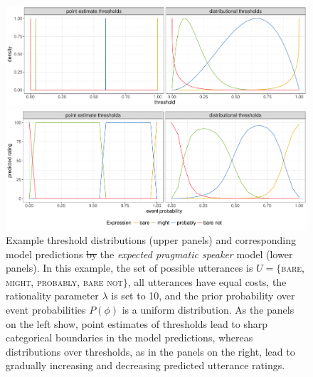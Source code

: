 \documentclass[man, floatsintext]{apa6}
\providecommand{\DIFadd}[1]{{\protect\color{blue}\uwave{#1}}} %
\providecommand{\DIFdel}[1]{{\protect\color{red}\sout{#1}}}                      %
\providecommand{\DIFaddFL}[1]{\DIFadd{#1}} %
\providecommand{\DIFdelFL}[1]{\DIFdel{#1}} %
\providecommand{\DIFaddbeginFL}{} %
\providecommand{\DIFaddendFL}{} %
\providecommand{\DIFdelbeginFL}{} %
\providecommand{\DIFdelendFL}{} %
\newcommand{\DIFscaledelfig}{0.5}
\newlength{\DIFdelgraphicswidth} %
\newlength{\DIFdelgraphicsheight} %
\newcommand{\DIFaddincludegraphics}[2][]{{\color{blue}\fbox{\DIFOincludegraphics[#1]{#2}}}} %
\newcommand{\DIFdelincludegraphics}[2][]{%
\sbox{\DIFdelgraphicsbox}{\DIFOincludegraphics[#1]{#2}}%
\settoboxwidth{\DIFdelgraphicswidth}{\DIFdelgraphicsbox} %
\settoboxtotalheight{\DIFdelgraphicsheight}{\DIFdelgraphicsbox} %
\scalebox{\DIFscaledelfig}{%
\parbox[b]{\DIFdelgraphicswidth}{\usebox{\DIFdelgraphicsbox}\\[-\baselineskip] \rule{\DIFdelgraphicswidth}{0em}}\llap{\resizebox{\DIFdelgraphicswidth}{\DIFdelgraphicsheight}{%
\setlength{\unitlength}{\DIFdelgraphicswidth}%
\begin{picture}(1,1)%
\thicklines\linethickness{2pt} %
{\color[rgb]{1,0,0}\put(0,0){\framebox(1,1){}}}%
{\color[rgb]{1,0,0}\put(0,0){\line( 1,1){1}}}%
{\color[rgb]{1,0,0}\put(0,1){\line(1,-1){1}}}%
\end{picture}%
}\hspace*{3pt}}} %
} %
\DeclareRobustCommand{\DIFaddbeginFL}{\DIFOaddbeginFL \let\includegraphics\DIFaddincludegraphics} %
\DeclareRobustCommand{\DIFaddendFL}{\DIFOaddendFL \let\includegraphics\DIFOincludegraphics} %
\DeclareRobustCommand{\DIFdelbeginFL}{\DIFOdelbeginFL \let\includegraphics\DIFdelincludegraphics} %
\DeclareRobustCommand{\DIFdelendFL}{\DIFOaddendFL \let\includegraphics\DIFOincludegraphics} %
\begin{document}
\begin{figure}[th!]
\includegraphics[width=\textwidth]{plots/model-visualization-distributions.pdf}

\includegraphics[width=\textwidth]{plots/model-visualization-predictions.pdf}

\caption{Example threshold distributions (upper panels) and corresponding model predictions \DIFdelbeginFL \DIFdelFL{by }\DIFdelendFL \DIFaddbeginFL \DIFaddFL{for }\DIFaddendFL the \textit{expected pragmatic speaker} model (lower panels). In this example, the set of possible utterances is $U=\{$\textsc{bare}, \textsc{might}, \textsc{probably}, \textsc{bare not}$\}$, all utterances have equal costs, the rationality parameter $\lambda$ is set to 10, and the prior probability over event probabilities $P(\phi)$ is a uniform distribution. As the panels on the left show, point estimates of thresholds lead to sharp categorical boundaries in the model predictions, whereas distributions over thresholds, as in the panels on the right, lead to gradually increasing and decreasing predicted utterance ratings. \label{fig:model-visualization}}
\end{figure}
\end{document}
